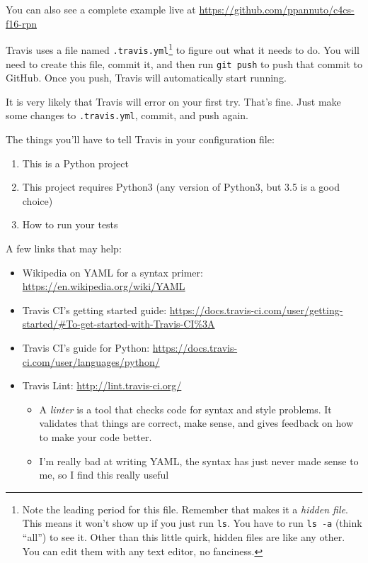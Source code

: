 \documentclass{article}
\begin{document}
You can also see a complete example live at
\url{https://github.com/ppannuto/c4cs-f16-rpn}

Travis uses a file named \texttt{.travis.yml}\footnote{%
  Note the leading period for this file. Remember that makes it a \emph{hidden
    file}. This means it won't show up if you just run \texttt{ls}. You have
  to run \texttt{ls -a} (think ``all'') to see it. Other than this little
  quirk, hidden files are like any other. You can edit them with any text
  editor, no fanciness.
} to figure out what it needs to do. You will need to create this file, commit
it, and then run \texttt{git push} to push that commit to GitHub. Once you
push, Travis will automatically start running.

It is very likely that Travis will error on your first try. That's fine. Just
make some changes to \texttt{.travis.yml}, commit, and push again.

The things you'll have to tell Travis in your configuration file:
\begin{enumerate}
  \item This is a Python project
  \item This project requires Python3 (any version of Python3, but 3.5 is a
    good choice)
  \item How to run your tests
\end{enumerate}

A few links that may help:
\begin{itemize}
  \item Wikipedia on YAML for a syntax primer: \url{https://en.wikipedia.org/wiki/YAML}
  \item Travis CI's getting started guide:
    \url{https://docs.travis-ci.com/user/getting-started/#To-get-started-with-Travis-CI\%3A}
  \item Travis CI's guide for Python:
    \url{https://docs.travis-ci.com/user/languages/python/}
  \item Travis Lint: \url{http://lint.travis-ci.org/}
    \begin{itemize}
      \item A \emph{linter} is a tool that checks code for syntax and style
        problems. It validates that things are correct, make sense, and gives
        feedback on how to make your code better.
      \item I'm really bad at writing YAML, the syntax has just never made
        sense to me, so I find this really useful
    \end{itemize}
\end{itemize}
\end{document}
